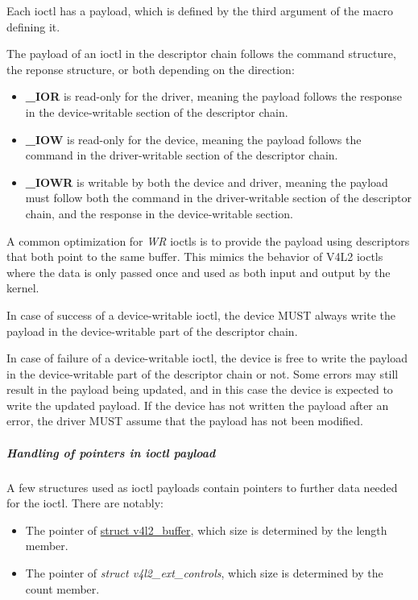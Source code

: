 Each ioctl has a payload, which is defined by the third argument of the
 macro defining it. 

The payload of an ioctl in the descriptor chain follows the command structure,
the reponse structure, or both depending on the direction:

\begin{itemize}
\item \textbf{_IOR} is read-only for the driver, meaning the payload
follows the response in the device-writable section of the descriptor chain.
\item \textbf{_IOW} is read-only for the device, meaning the payload
follows the command in the driver-writable section of the descriptor chain.
\item \textbf{_IOWR} is writable by both the device and driver,
meaning the payload must follow both the command in the driver-writable section
of the descriptor chain, and the response in the device-writable section.
\end{itemize}

A common optimization for \textit{WR} ioctls is to provide the payload using
descriptors that both point to the same buffer. This mimics the behavior of
V4L2 ioctls where the data is only passed once and used as both input and
output by the kernel.


In case of success of a device-writable ioctl, the device MUST always write the
payload in the device-writable part of the descriptor chain.

In case of failure of a device-writable ioctl, the device is free to write the
payload in the device-writable part of the descriptor chain or not. Some errors
may still result in the payload being updated, and in this case the device is
expected to write the updated payload. If the device has not written the
payload after an error, the driver MUST assume that the payload has not been
modified.

\subparagraph{Handling of pointers in ioctl payload}

A few structures used as ioctl payloads contain pointers to further
data needed for the ioctl. There are notably:

\begin{itemize}
\item The  pointer of
\href{https://www.kernel.org/doc/html/latest/userspace-api/media/v4l/buffer.html#struct-v4l2-buffer}{struct v4l2_buffer},
which size is determined by the length member.
\item The  pointer of \textit{struct v4l2_ext_controls}, which
size is determined by the count member.
\end{itemize}

